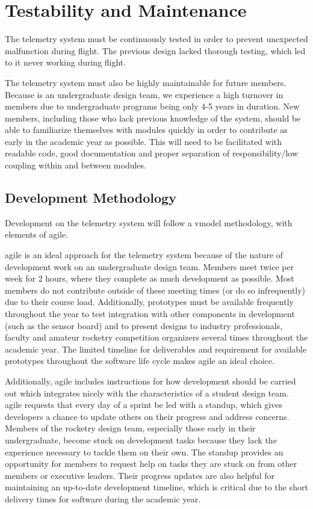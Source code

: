 \section{Testability and Maintenance}

The  telemetry system must be continuously tested in order to prevent unexpected malfunction
during flight. The previous design lacked thorough testing, which led to it never working during flight.

The telemetry system must also be highly maintainable for future members. Because  is an
undergraduate design team, we experience a high turnover in members due to undergraduate programs being only 4-5 years
in duration. New members, including those who lack previous knowledge of the system, should be able to familiarize
themselves with modules quickly in order to contribute as early in the academic year as possible. This will need to be
facilitated with readable code, good documentation and proper separation of responsibility/low coupling within and
between modules.

\subsection{Development Methodology}

Development on the telemetry system will follow a \gls{vmodel} methodology, with elements of \gls{agile}.

\Gls{agile} is an ideal approach for the  telemetry system because of the nature of development work
on an undergraduate design team. Members meet twice per week for 2 hours, where they complete as much development as
possible. Most members do not contribute outside of these meeting times (or do so infrequently) due to their course
load. Additionally, prototypes must be available frequently throughout the year to test integration with other
components in development (such as the  sensor board) and to present designs to industry
professionals, faculty and amateur rocketry competition organizers several times throughout the academic year. The
limited timeline for deliverables and requirement for available prototypes throughout the software life cycle makes
\gls{agile} an ideal choice.

Additionally, \gls{agile} includes instructions for how development should be carried out which integrates nicely with
the characteristics of a student design team. \Gls{agile} requests that every day of a sprint be led with a
\gls{standup}, which gives developers a chance to update others on their progress and address concerns. Members of the
 rocketry design team, especially those early in their undergraduate, become stuck on
development tasks because they lack the experience necessary to tackle them on their own. The \gls{standup} provides an
opportunity for members to request help on tasks they are stuck on from other members or executive leaders. Their
progress updates are also helpful for maintaining an up-to-date development timeline, which is critical due to the
short delivery times for software during the academic year.

